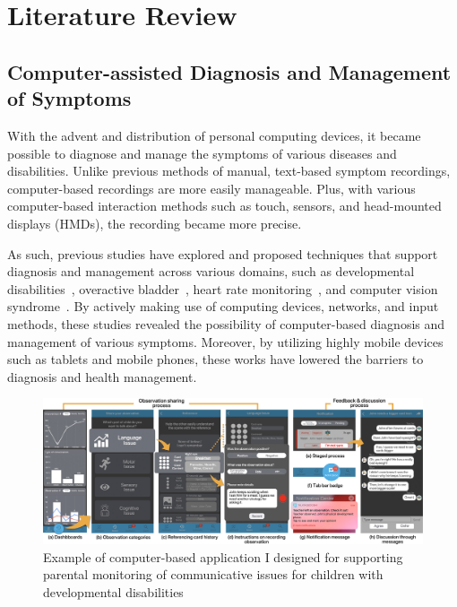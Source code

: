 \section{Literature Review}

\subsection{Computer-assisted Diagnosis and Management of Symptoms}

With the advent and distribution of personal computing devices, it became possible to diagnose and manage the symptoms of various diseases and disabilities. Unlike previous methods of manual, text-based symptom recordings, computer-based recordings are more easily manageable. Plus, with various computer-based interaction methods such as touch, sensors, and head-mounted displays (HMDs), the recording became more precise.

As such, previous studies have explored and proposed techniques that support diagnosis and management across various domains, such as developmental disabilities~\cite{shin2020talkingboogie}, overactive bladder~\cite{salai2019wee}, heart rate monitoring~\cite{li2019current}, and computer vision syndrome~\cite{liquideye}. By actively making use of computing devices, networks, and input methods, these studies revealed the possibility of computer-based diagnosis and management of various symptoms. Moreover, by utilizing highly mobile devices such as tablets and mobile phones, these works have lowered the barriers to diagnosis and health management.

\begin{figure}[h!]
    \centering
    \includegraphics[width=\linewidth]{figure/tracker_explain_second.jpg}
    \caption{Example of computer-based application I designed for supporting parental monitoring of communicative issues for children with developmental disabilities~\cite{shin2020talkingboogie}}
    \label{fig:my_label}
\end{figure}

